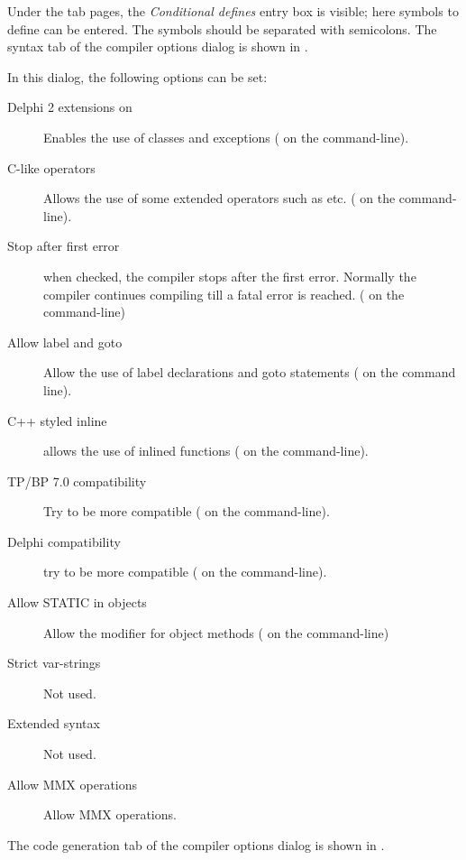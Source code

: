 Under the tab pages, the {\em Conditional defines} entry box is visible;
here symbols to define can be entered. The symbols should be separated with
semicolons. The syntax tab of the compiler options dialog is shown in
.


In this dialog, the following options can be set:
\begin{description}
\item[Delphi 2 extensions on]
Enables the use of classes and exceptions ( on the command-line).
\item[C-like operators]
Allows the use of some extended operators such as \var{+=, -=} etc.
( on the command-line).
\item[Stop after first error]  when checked, the compiler stops after the
first error. Normally the compiler continues compiling till a fatal error is
reached. ( on the command-line)
\item[Allow label and goto] Allow the use of label declarations and goto
statements ( on the command line).
\item[C++ styled inline] allows the use of inlined functions ( on
the command-line).
\item[TP/BP 7.0 compatibility] Try to be more \tp compatible ( on
the command-line).
\item[Delphi compatibility] try to be more \delphi compatible ( on
the command-line).
\item[Allow STATIC in objects] Allow the  modifier for object
methods ( on the command-line)
\item[Strict var-strings] Not used.
\item[Extended syntax] Not used.
\item[Allow MMX operations] Allow MMX operations.
\end{description}

The code generation tab of the compiler options dialog is shown in
.


